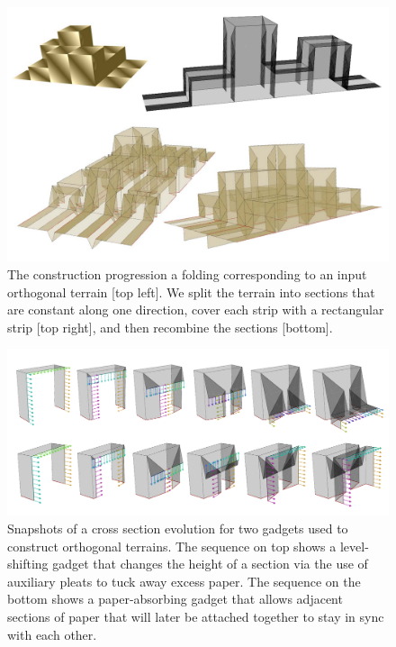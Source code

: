 \documentclass[a4paper,11pt]{article}
\begin{document}
\begin{figure}
  \centering
  \includegraphics[width=\linewidth]{Figures/fig1sm.pdf}
  \caption{The construction progression a folding corresponding to an input
orthogonal terrain [top left]. We split the terrain into sections that are
constant along one direction, cover each strip with a rectangular strip [top
right], and then recombine the sections [bottom]. }
 \label{fig:extrude}
\end{figure}
\begin{figure}
  \centering
  \includegraphics[width=\linewidth]{Figures/fig2sm.pdf}
  \caption{Snapshots of a cross section evolution for two gadgets used to
construct orthogonal terrains. The sequence on top shows a level-shifting gadget
that changes the height of a section via the use of auxiliary pleats to tuck 
away excess paper. The sequence on the bottom shows a paper-absorbing gadget
that allows adjacent sections of paper that will later be attached together to
stay in sync with each other. }
 \label{fig:extrude}
\end{figure}
\end{document}
